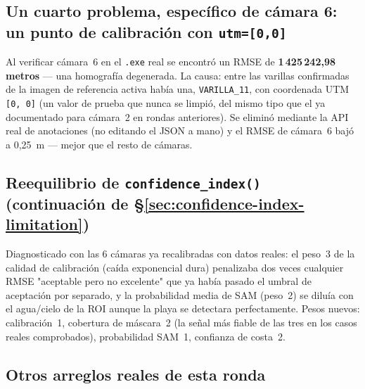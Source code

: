 \subsection{Un cuarto problema, específico de cámara 6: un punto de calibración con \texttt{utm=[0,0]}}

Al verificar cámara~6 en el \texttt{.exe} real se encontró un RMSE de \textbf{1\,425\,242,98
metros} — una homografía degenerada. La causa: entre las varillas confirmadas de la imagen de
referencia activa había una, \texttt{VARILLA\_11}, con coordenada UTM \texttt{[0, 0]} (un valor
de prueba que nunca se limpió, del mismo tipo que el ya documentado para cámara~2 en rondas
anteriores). Se eliminó mediante la API real de anotaciones (no editando el JSON a mano) y el
RMSE de cámara~6 bajó a 0,25~m — mejor que el resto de cámaras.

\subsection{Reequilibrio de \texttt{confidence\_index()} (continuación de \S\ref{sec:confidence-index-limitation})}

Diagnosticado con las 6 cámaras ya recalibradas con datos reales: el peso~3 de la calidad de
calibración (caída exponencial dura) penalizaba dos veces cualquier RMSE "aceptable pero no
excelente" que ya había pasado el umbral de aceptación por separado, y la probabilidad media de
SAM (peso~2) se diluía con el agua/cielo de la ROI aunque la playa se detectara perfectamente.
Pesos nuevos: calibración~1, cobertura de máscara~2 (la señal más fiable de las tres en los
casos reales comprobados), probabilidad SAM~1, confianza de costa~2.

\subsection{Otros arreglos reales de esta ronda}

